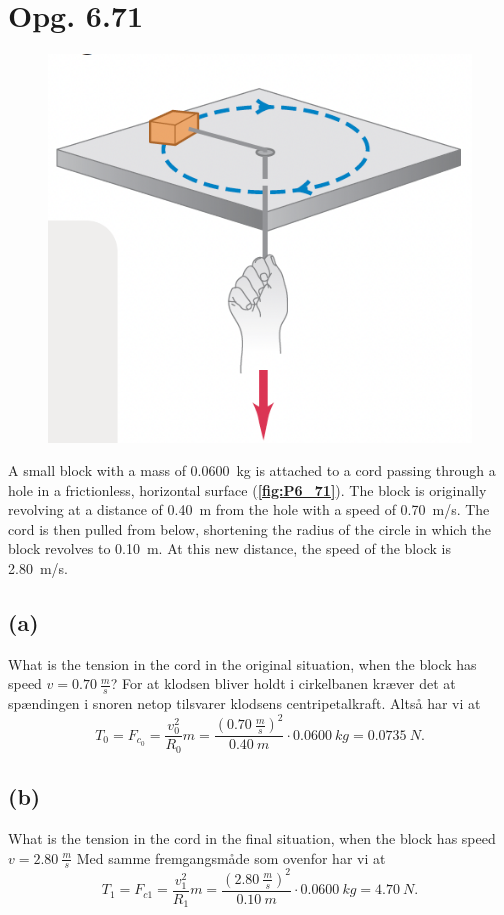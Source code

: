 \documentclass[12pt]{article}
\begin{document}
\section*{Opg. 6.71}
\begin{figure} [ht]
  \centering
  \caption{}
  \includegraphics[width=0.5\linewidth]{../figures/P6_71.png}
  \label{fig:P6_71}
\end{figure}

A small block with a mass of \qty{0,0600}{kg} is attached to a cord passing through a hole in a frictionless, horizontal surface (\textbf{\autoref{fig:P6_71}}). The block is originally revolving at a distance of \qty{0,40}{m} from the hole with a speed of \qty{0,70}{m/s}. The cord is then pulled from below, shortening the radius of the circle in which the block revolves to \qty{0,10}{m}. At this new distance, the speed of the block is \qty{2,80}{m/s}.


\subsection*{(a)}
What is the tension in the cord in the original situation, when the block has speed $v = \qty{0,70}{\frac{m}{s}}$?
\bigbreak
For at klodsen bliver holdt i cirkelbanen kræver det at spændingen i snoren netop tilsvarer klodsens centripetalkraft. Altså har vi at
\[
T_0 = F_{c_0} = \frac{v_0^2}{R_0}m = \frac{\left( \qty{0,70}{\frac{m}{s}} \right) ^2}{\qty{0,40}{m}}\cdot \qty{0,0600}{kg} = \qty{0,0735}{N}
.\] 

\subsection*{(b)}
What is the tension in the cord in the final situation, when the block has speed $v = \qty{2,80}{\frac{m}{s}}$
\bigbreak
Med samme fremgangsmåde som ovenfor har vi at
\[
T_1 = F_{c1} = \frac{v_1^2}{R_1}m = \frac{\left( \qty{2,80}{\frac{m}{s}} \right) ^2}{\qty{0,10}{m}}\cdot \qty{0,0600}{kg} = \qty{4,70}{N}
.\] 
\end{document}
